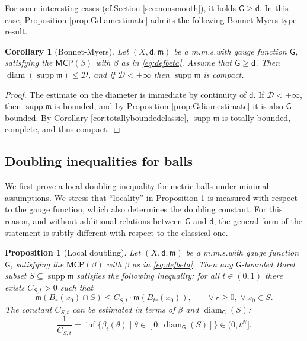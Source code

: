\documentclass[11pt,a4paper]{article}
\theoremstyle{plain}
\newtheorem{corollary}[theorem]{Corollary}
\newtheorem{proposition}[theorem]{Proposition}
\theoremstyle{definition}
\theoremstyle{remark}
\numberwithin{equation}{section}
\DeclareMathOperator{\supp}{\mathrm{supp}}
\newcommand{\MCP}{\mathsf{MCP}}
\newcommand{\cD}{\mathcal{D}}
\DeclareMathOperator{\diam}{\mathrm{diam}}
\newcommand{\mm}{\mathfrak m}
\newcommand{\sfd}{\mathsf d}
\newcommand{\sfG}{\mathsf G}
\begin{document}
For some interesting cases (cf.\@ Section \ref{sec:nonsmooth}), it holds $\sfG \geq \sfd$. In this case, Proposition \ref{prop:Gdiamestimate} admits the following Bonnet-Myers type result.

\begin{corollary}[Bonnet-Myers]\label{cor:BonMy}
Let $(X,\sfd,\mm)$ be a m.m.s.\@ with gauge function $\sfG$, satisfying the $\MCP(\beta)$ with $\beta$ as in \eqref{eq:defbeta}. Assume that $\sfG \geq \sfd$. Then $\diam(\supp\mm) \leq \cD$, and if $\cD<+\infty$ then $\supp\mm$ is compact.
\end{corollary}
\begin{proof}
The estimate on the diameter is immediate by continuity of $\sfd$. If $\cD<+\infty$, then $\supp\mm$ is bounded, and by Proposition \ref{prop:Gdiamestimate} it is also $\sfG$-bounded. By Corollary \ref{cor:totallyboundedclassic}, $\supp\mm$ is totally bounded, complete, and thus compact.
\end{proof}


\subsection{Doubling inequalities for balls}\label{Sec:Doubling}

We first prove a local doubling inequality for metric balls under minimal assumptions. We stress that ``locality'' in Proposition \ref{prop:doublingsimple} is measured with respect to the gauge function, which also determines the doubling constant. For this reason, and without additional relations between $\sfG$ and $\sfd$, the general form of the statement is subtly different with respect to the classical one.

\begin{proposition}[Local doubling]\label{prop:doublingsimple}
Let $(X,\sfd,\mm)$ be a m.m.s.\@ with gauge function $\sfG$, satisfying the $\MCP(\beta)$ with $\beta$ as in \eqref{eq:defbeta}.
Then any $\sfG$-bounded Borel subset $S\subseteq \supp\mm$ satisfies the following inequality: for all $t\in (0,1)$ there exists $C_{S,t}>0$ such that 
\begin{equation}\label{eq:doublingsimple}
\mm(B_{r}(x_0)\cap S)\leq C_{S,t}\cdot \mm(B_{tr}(x_0)),\qquad \forall\, r\geq 0,\; \forall\, x_0\in S.
\end{equation}
The constant $C_{S,t}$ can be estimated in terms of $\beta$ and $\diam_{\sfG}(S)$:
\begin{equation}\label{eq:crR}
\frac{1}{C_{S,t}} =\inf\{\beta_{t}(\theta)\mid \theta \in [0,\diam_{\sfG}(S)]\}  \in (0,t^N].
\end{equation}
\end{proposition}
\end{document}
